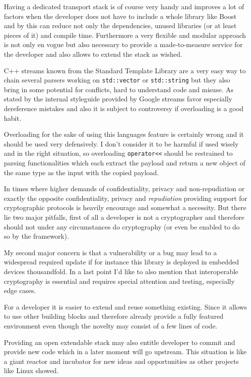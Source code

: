 \documentclass[twocolumn,english]{IEEEtran}
\theoremstyle{plain}
\theoremstyle{plain}
\begin{document}
Having a dedicated transport stack is of course very handy and improves a lot
of factors when the developer does not have to include a whole library like
Boost and by this can reduce not only the dependencies, unused libraries (or
at least pieces of it) and compile time. Furthermore a very flexible and
modular approach is not only en vogue but also necessary to provide a
made-to-measure service for the developer and also allows to extend the stack
as wished.

C++ streams known from the Standard Template Library are a very easy way to
chain several parsers working on \texttt{std::vector} or \texttt{std::string}
but they also bring in some potential for conflicts, hard to understand code
and misuse. As stated by the internal styleguide provided by
Google\cite{google:cpp-styleguide} streams favor especially dereference
mistakes and also it is subject to controversy if overloading is a good
habit.

Overloading for the sake of using this languages feature is certainly wrong
and it should be used very defensively. I don't consider it to be harmful if
used wisely and in the right situation, so overloading \texttt{operator<<}
should be restrained to parsing functionalities which each extract the
payload and return a new object of the same type as the input with the copied
payload.

In times where higher demands of confidentiality, privacy and
non-repudiation or exactly the opposite confidentiality, privacy and
\emph{repudiation} providing support for cryptographic protocols is heavily
encourage and somewhat a necessity. But there lie two major pitfalls, first
of all a developer is not a cryptographer and therefore should not under any
circumstances do cryptography (or even be enabled to do so by the
framework)\cite{pzimmermann:introtocrypto}.

My second major concern is that a vulnerability or a bug may lead to a
widespread required update if for instance this library is deployed in
embedded devices thousandfold. In a last point I'd like to also mention that
interoperable cryptography is essential and requires special attention and
testing, especially edge cases.

For a developer it is easier to extend and reuse something existing. Since it
allows to use other building blocks and therefore already provide a fully
featured environment even though the novelty may consist of a few lines of
code.

Providing an open extendable stack may also entitle developer to commit and
provide new code which in a later moment will go upstream. This situation is
like a giant reactor and incubator for new ideas and opportunities as other
projects like Linux showed.
\end{document}
